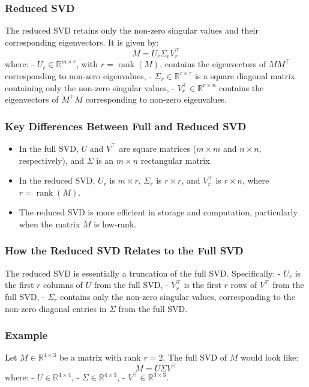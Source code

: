 \documentclass{article}
\begin{document}
\subsubsection{Reduced SVD}
The reduced SVD retains only the non-zero singular values and their corresponding eigenvectors. It is given by:
\[
M = U_r \Sigma_r V_r^\top
\]
where:
- \( U_r \in \mathbb{R}^{m \times r} \), with \( r = \operatorname{rank}(M) \), contains the eigenvectors of \( M M^\top \) corresponding to non-zero eigenvalues,
- \( \Sigma_r \in \mathbb{R}^{r \times r} \) is a square diagonal matrix containing only the non-zero singular values,
- \( V_r^\top \in \mathbb{R}^{r \times n} \) contains the eigenvectors of \( M^\top M \) corresponding to non-zero eigenvalues.

\subsubsection{Key Differences Between Full and Reduced SVD}
\begin{itemize}
    \item In the full SVD, \( U \) and \( V^\top \) are square matrices (\( m \times m \) and \( n \times n \), respectively), and \( \Sigma \) is an \( m \times n \) rectangular matrix.
    \item In the reduced SVD, \( U_r \) is \( m \times r \), \( \Sigma_r \) is \( r \times r \), and \( V_r^\top \) is \( r \times n \), where \( r = \operatorname{rank}(M) \).
    \item The reduced SVD is more efficient in storage and computation, particularly when the matrix \( M \) is low-rank.
\end{itemize}

\subsubsection{How the Reduced SVD Relates to the Full SVD}
The reduced SVD is essentially a truncation of the full SVD. Specifically:
- \( U_r \) is the first \( r \) columns of \( U \) from the full SVD,
- \( V_r^\top \) is the first \( r \) rows of \( V^\top \) from the full SVD,
- \( \Sigma_r \) contains only the non-zero singular values, corresponding to the non-zero diagonal entries in \( \Sigma \) from the full SVD.

\subsubsection{Example}
Let \( M \in \mathbb{R}^{4 \times 3} \) be a matrix with rank \( r = 2 \). The full SVD of \( M \) would look like:
\[
M = U \Sigma V^\top
\]
where:
- \( U \in \mathbb{R}^{4 \times 4} \),
- \( \Sigma \in \mathbb{R}^{4 \times 3} \),
- \( V^\top \in \mathbb{R}^{3 \times 3} \).
\end{document}
